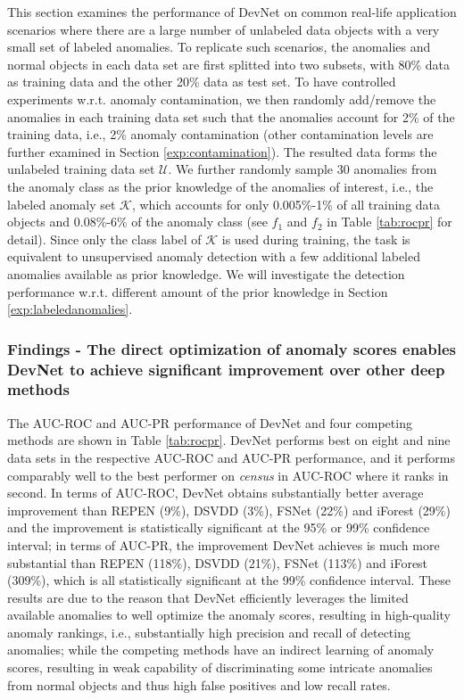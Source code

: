 \documentclass[sigconf]{acmart}
\begin{document}
This section examines the performance of DevNet on common real-life application scenarios where there are a large number of unlabeled data objects with a very small set of labeled anomalies. To replicate such scenarios, the anomalies and normal objects in each data set are first splitted into two subsets, with 80\% data as training data and the other 20\% data as test set. To have controlled experiments w.r.t. anomaly contamination, we then randomly add/remove the anomalies in each training data set such that the anomalies account for 2\% of the training data, i.e., 2\% anomaly contamination (other contamination levels are further examined in Section \ref{exp:contamination}). The resulted data forms the unlabeled training data set $\mathcal{U}$. We further randomly sample 30 anomalies from the anomaly class as the prior knowledge of the anomalies of interest, i.e., the labeled anomaly set $\mathcal{K}$, which accounts for only 0.005\%-1\% of all training data objects and 0.08\%-6\% of the anomaly class (see $f_1$ and $f_2$ in Table \ref{tab:rocpr} for detail). Since only the class label of $\mathcal{K}$ is used during training, the task is equivalent to unsupervised anomaly detection with a few additional labeled anomalies available as prior knowledge. We will investigate the detection performance w.r.t. different amount of the prior knowledge in Section \ref{exp:labeledanomalies}. 

\subsubsection{Findings - The direct optimization of anomaly scores enables DevNet to achieve significant improvement over other deep methods}
The AUC-ROC and AUC-PR performance of DevNet and four competing methods are shown in Table \ref{tab:rocpr}. DevNet performs best on eight and nine data sets in the respective AUC-ROC and AUC-PR performance, and it performs comparably well to the best performer on \textit{census} in AUC-ROC where it ranks in second. In terms of AUC-ROC, DevNet obtains substantially better average improvement than REPEN (9\%), DSVDD (3\%), FSNet (22\%) and iForest (29\%) and the improvement is statistically significant at the 95\% or 99\% confidence interval; in terms of AUC-PR, the improvement DevNet achieves is much more substantial than REPEN (118\%), DSVDD (21\%), FSNet (113\%) and iForest (309\%), which is all statistically significant at the 99\% confidence interval. These results are due to the reason that DevNet efficiently leverages the limited available anomalies to well optimize the anomaly scores, resulting in high-quality anomaly rankings, i.e., substantially high precision and recall of detecting anomalies; while the competing methods have an indirect learning of anomaly scores, resulting in weak capability of discriminating some intricate anomalies from normal objects and thus high false positives and low recall rates.
\end{document}
